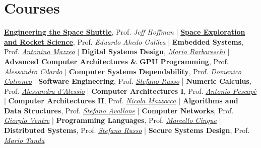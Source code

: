 \documentclass[letterpaper]{twentysecondcv} %
\begin{document}

\section{Courses}

\href{https://www.edx.org/course/engineering-the-space-shuttle}{\textbf{Engineering the Space Shuttle}}, Prof. \textit{Jeff Hoffman} |
\href{https://www.edx.org/course/the-conquest-of-space-space-exploration-and-rocket}{\textbf{Space Exploration and Rocket Science}}, Prof. \textit{Eduardo Ahedo Galilea} |
\textbf{Embedded Systems}, Prof. \href{https://www.docenti.unina.it/antonino.mazzeo}{\textit{Antonino Mazzeo}} |
\textbf{Digital Systems Design}, \href{https://www.researchgate.net/profile/Mario_Barbareschi}{\textit{Mario Barbareschi}} |
\textbf{Advanced Computer Architectures \& GPU Programming}, Prof. \href{https://www.docenti.unina.it/alessandro.cilardo}{\textit{Alessandro Cilardo}} |
\textbf{Computer Systems Dependability}, Prof. \href{https://www.docenti.unina.it/domenico.cotroneo}{\textit{Domenico Cotroneo}} |
\textbf{Software Engineering}, Prof. \href{https://www.docenti.unina.it/stefano.russo}{\textit{Stefano Russo}} |
\textbf{Numeric Calculus}, Prof. \href{https://www.docenti.unina.it/alessandra.dalessio}{\textit{Alessandra d'Alessio}} |
\textbf{Computer Architectures I}, Prof. \href{https://www.docenti.unina.it/antonio.pescape}{\textit{Antonio Pescapè}} |
\textbf{Computer Architectures II}, Prof. \href{https://www.docenti.unina.it/nicola.mazzocca}{\textit{Nicola Mazzocca}} |
\textbf{Algorithms and Data Structures}, Prof. \href{https://www.docenti.unina.it/stefano.avallone}{\textit{Stefano Avallone}} |
\textbf{Computer Networks}, Prof. \href{https://www.docenti.unina.it/giorgio.ventre}{\textit{Giorgio Ventre}} |
\textbf{Programming Languages}, Prof. \href{https://www.docenti.unina.it/marcello.cinque}{\textit{Marcello Cinque}} |
\textbf{Distributed Systems}, Prof. \href{https://www.docenti.unina.it/stefano.russo}{\textit{Stefano Russo}} |
\textbf{Secure Systems Design}, Prof. \href{ttps://www.docenti.unina.it/mario.tanda}{\textit{Mario Tanda}}
\end{document}
